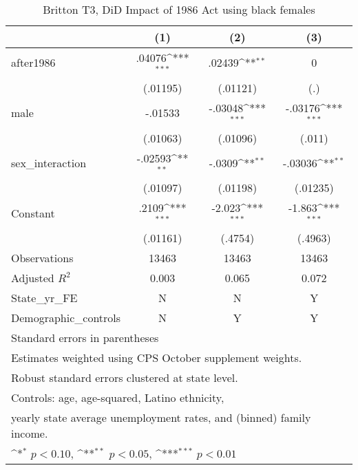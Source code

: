 \begin{table}[htbp]\centering
\def\sym#1{\ifmmode^{#1}\else\(^{#1}\)\fi}
\caption{Britton T3, DiD Impact of 1986 Act using black females}
\begin{tabular}{l*{3}{c}}
\hline\hline
                    &\multicolumn{1}{c}{(1)}         &\multicolumn{1}{c}{(2)}         &\multicolumn{1}{c}{(3)}         \\
\hline
after1986           &      .04076\sym{***}&      .02439\sym{**} &           0         \\
                    &    (.01195)         &    (.01121)         &         (.)         \\
[1em]
male                &     -.01533         &     -.03048\sym{***}&     -.03176\sym{***}\\
                    &    (.01063)         &    (.01096)         &      (.011)         \\
[1em]
sex\_interaction     &     -.02593\sym{**} &      -.0309\sym{**} &     -.03036\sym{**} \\
                    &    (.01097)         &    (.01198)         &    (.01235)         \\
[1em]
Constant            &       .2109\sym{***}&      -2.023\sym{***}&      -1.863\sym{***}\\
                    &    (.01161)         &     (.4754)         &     (.4963)         \\
\hline
Observations        &       13463         &       13463         &       13463         \\
Adjusted \(R^{2}\)  &       0.003         &       0.065         &       0.072         \\
State\_yr\_FE         &           N         &           N         &           Y         \\
Demographic\_controls&           N         &           Y         &           Y         \\
\hline\hline
\multicolumn{4}{l}{\footnotesize Standard errors in parentheses}\\
\multicolumn{4}{l}{\footnotesize Estimates weighted using CPS October supplement weights.}\\
\multicolumn{4}{l}{\footnotesize Robust standard errors clustered at state level.}\\
\multicolumn{4}{l}{\footnotesize Controls: age, age-squared, Latino ethnicity,}\\
\multicolumn{4}{l}{\footnotesize yearly state average unemployment rates, and (binned) family income.}\\
\multicolumn{4}{l}{\footnotesize \sym{*} \(p<0.10\), \sym{**} \(p<0.05\), \sym{***} \(p<0.01\)}\\
\end{tabular}
\end{table}
